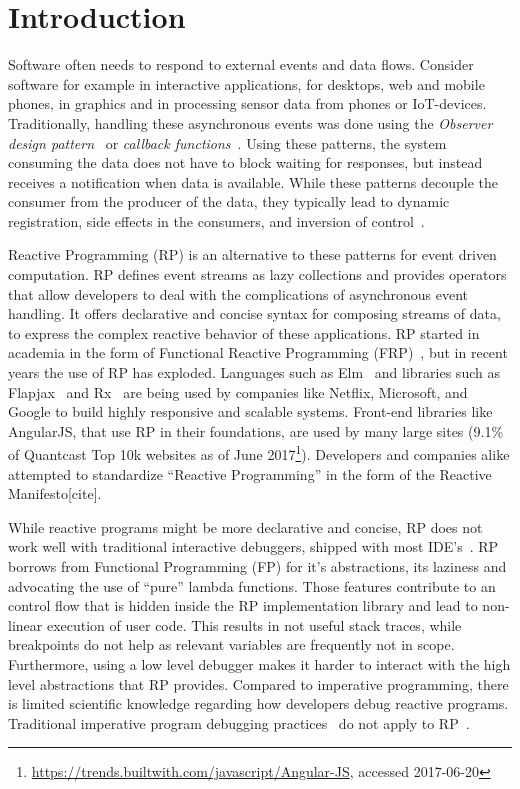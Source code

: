\section{Introduction}

Software often needs to respond to external events and data flows. Consider software for example in interactive applications, for desktops, web and mobile phones, in graphics and in processing sensor data from phones or IoT-devices. Traditionally, handling these asynchronous events was done using the \emph{Observer design pattern}~\cite{johnson1995design} or \emph{callback functions}~\cite{gallaba2015don}. 
Using these patterns, the system consuming the data does not have to block waiting for responses, but instead receives a notification when data is available. While these patterns decouple the consumer from the producer of the data, they typically lead to dynamic registration, side effects in the consumers, and inversion of control~\cite{salvaneschi2014empirical}.

Reactive Programming (RP) is an alternative to these patterns for event driven computation. 
RP defines event streams as lazy collections and provides operators that allow developers to deal with the complications of asynchronous event handling.
It offers declarative and concise syntax for composing streams of data, to express the complex reactive behavior of these applications.
RP started in academia in the form of Functional Reactive Programming (FRP)~\cite{elliott1997functional,elliott2009push,czaplicki2013asynchronous,maier2010deprecating}, but in recent years the use of RP has exploded. Languages such as Elm~\cite{czaplicki2012elm} and libraries such as Flapjax~\cite{meyerovich2009flapjax} and Rx~\cite{meijer2010subject} are being used by companies like Netflix, Microsoft, and Google to build highly responsive and scalable systems. Front-end libraries like AngularJS, that use RP in their foundations, are used by many large sites (9.1\% of Quantcast Top 10k websites as of June 2017\footnote{
	\url{https://trends.builtwith.com/javascript/Angular-JS}, accessed 2017-06-20
}). Developers and companies alike attempted to standardize ``Reactive Programming'' in the form of the Reactive Manifesto[cite].


While reactive programs might be more declarative and concise, RP does not work well with traditional interactive debuggers, shipped with most IDE's~\cite{salvaneschi2016debugging}. RP borrows from Functional Programming (FP) for it's abstractions, its laziness and advocating the use of ``pure'' lambda functions. Those features contribute to an control flow that is hidden inside the RP implementation library and lead to non-linear execution of user code. This results in not useful stack traces, while breakpoints do not help as relevant variables are frequently not in scope. Furthermore, using a low level debugger makes it harder to interact with the high level abstractions that RP provides.
Compared to imperative programming, there is limited scientific knowledge regarding how developers debug reactive programs. Traditional imperative program debugging practices~\cite{} do not apply to RP~\cite{}. 

